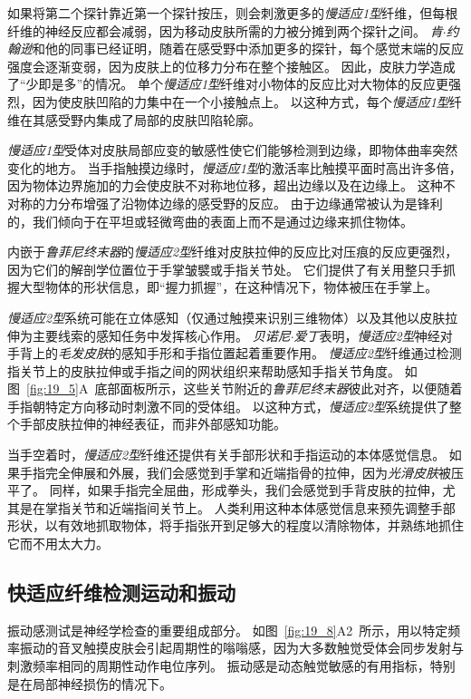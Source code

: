 如果将第二个探针靠近第一个探针按压，则会刺激更多的\textit{慢适应1型}纤维，但每根纤维的神经反应都会减弱，因为移动皮肤所需的力被分摊到两个探针之间。
\textit{肯$\cdot$约翰逊}和他的同事已经证明，随着在感受野中添加更多的探针，每个感觉末端的反应强度会逐渐变弱，因为皮肤上的位移力分布在整个接触区。
因此，皮肤力学造成了“少即是多”的情况。
单个\textit{慢适应1型}纤维对小物体的反应比对大物体的反应更强烈，因为使皮肤凹陷的力集中在一个小接触点上。
以这种方式，每个\textit{慢适应1型}纤维在其感受野内集成了局部的皮肤凹陷轮廓。


\textit{慢适应1型}受体对皮肤局部应变的敏感性使它们能够检测到边缘，即物体曲率突然变化的地方。
当手指触摸边缘时，\textit{慢适应1型}的激活率比触摸平面时高出许多倍，因为物体边界施加的力会使皮肤不对称地位移，超出边缘以及在边缘上。
这种不对称的力分布增强了沿物体边缘的感受野的反应。
由于边缘通常被认为是锋利的，我们倾向于在平坦或轻微弯曲的表面上而不是通过边缘来抓住物体。


内嵌于\textit{鲁菲尼终末器}的\textit{慢适应2型}纤维对皮肤拉伸的反应比对压痕的反应更强烈，因为它们的解剖学位置位于手掌皱襞或手指关节处。
它们提供了有关用整只手抓握大型物体的形状信息，即“握力抓握”，在这种情况下，物体被压在手掌上。


\textit{慢适应2型}系统可能在立体感知（仅通过触摸来识别三维物体）以及其他以皮肤拉伸为主要线索的感知任务中发挥核心作用。
\textit{贝诺尼$\cdot$爱丁}表明，\textit{慢适应2型}神经对手背上的\textit{毛发皮肤}的感知手形和手指位置起着重要作用。
\textit{慢适应2型}纤维通过检测指关节上的皮肤拉伸或手指之间的网状组织来帮助感知手指关节角度。
如图~\ref{fig:19_5}A~底部面板所示，这些关节附近的\textit{鲁菲尼终末器}彼此对齐，以便随着手指朝特定方向移动时刺激不同的受体组。
以这种方式，\textit{慢适应2型}系统提供了整个手部皮肤拉伸的神经表征，而非外部感知功能。


当手空着时，\textit{慢适应2型}纤维还提供有关手部形状和手指运动的本体感觉信息。
如果手指完全伸展和外展，我们会感觉到手掌和近端指骨的拉伸，因为\textit{光滑皮肤}被压平了。
同样，如果手指完全屈曲，形成拳头，我们会感觉到手背皮肤的拉伸，尤其是在掌指关节和近端指间关节上。
人类利用这种本体感觉信息来预先调整手部形状，以有效地抓取物体，将手指张开到足够大的程度以清除物体，并熟练地抓住它而不用太大力。



\subsection{快适应纤维检测运动和振动}

振动感测试是神经学检查的重要组成部分。
如图~\ref{fig:19_8}A2~所示，用以特定频率振动的音叉触摸皮肤会引起周期性的嗡嗡感，因为大多数触觉受体会同步发射与刺激频率相同的周期性动作电位序列。
振动感是动态触觉敏感的有用指标，特别是在局部神经损伤的情况下。


